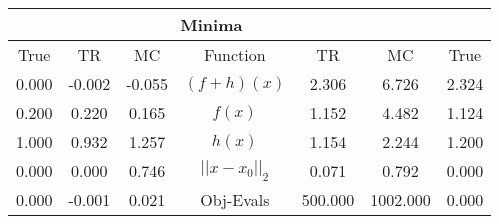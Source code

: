 \begin{tabular}{| c |c |c || c |c |c |c |}
    \hline
    \rowcolor[gray]{0.9}
\multicolumn{3}{|c|}{Parameters} & \multicolumn{4}{|c|}{Minima}\\ \hline True & TR & MC  & Function & TR & MC & True \\
    \hline
  \rowcolor[gray]{0.7}
  0.000 & -0.002 & -0.055   & $ (f + h)(x) $ & 2.306 & 6.726 & 2.324 \\
  \rowcolor[gray]{0.8}
  0.200 & 0.220 & 0.165   & $ f(x) $ & 1.152 & 4.482 & 1.124 \\
  \rowcolor[gray]{0.7}
  1.000 & 0.932 & 1.257   & $ h(x) $ & 1.154 & 2.244 & 1.200 \\
  \rowcolor[gray]{0.8}
  0.000 & 0.000 & 0.746   & $ ||x - x_0||_2 $ & 0.071 & 0.792 & 0.000 \\
  \rowcolor[gray]{0.7}
  0.000 & -0.001 & 0.021   & Obj-Evals & 500.000 & 1002.000 & 0.000 \\
\end{tabular}
